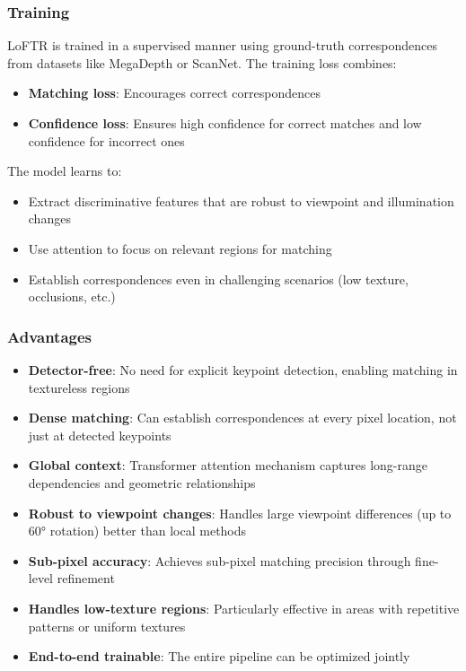 \documentclass[11pt,a4paper]{article}
\theoremstyle{definition}
\theoremstyle{plain}
\theoremstyle{remark}
\begin{document}
\subsubsection{Training}

LoFTR is trained in a supervised manner using ground-truth correspondences from datasets like MegaDepth or ScanNet. The training loss combines:
\begin{itemize}
    \item \textbf{Matching loss}: Encourages correct correspondences
    \item \textbf{Confidence loss}: Ensures high confidence for correct matches and low confidence for incorrect ones
\end{itemize}

The model learns to:
\begin{itemize}
    \item Extract discriminative features that are robust to viewpoint and illumination changes
    \item Use attention to focus on relevant regions for matching
    \item Establish correspondences even in challenging scenarios (low texture, occlusions, etc.)
\end{itemize}

\subsubsection{Advantages}

\begin{tcolorbox}[colback=orange!5!white,colframe=orange!75!black,title=\textbf{LoFTR Advantages}]
\begin{itemize}
    \item \textbf{Detector-free}: No need for explicit keypoint detection, enabling matching in textureless regions
    \item \textbf{Dense matching}: Can establish correspondences at every pixel location, not just at detected keypoints
    \item \textbf{Global context}: Transformer attention mechanism captures long-range dependencies and geometric relationships
    \item \textbf{Robust to viewpoint changes}: Handles large viewpoint differences (up to 60° rotation) better than local methods
    \item \textbf{Sub-pixel accuracy}: Achieves sub-pixel matching precision through fine-level refinement
    \item \textbf{Handles low-texture regions}: Particularly effective in areas with repetitive patterns or uniform textures
    \item \textbf{End-to-end trainable}: The entire pipeline can be optimized jointly
\end{itemize}
\end{tcolorbox}
\end{document}
